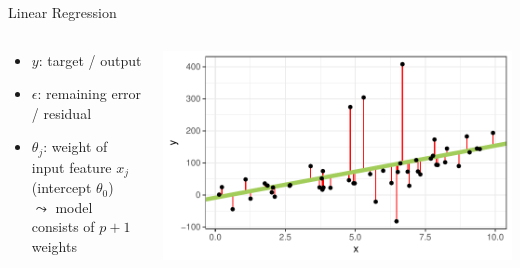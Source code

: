 \documentclass[10pt,compress,t,notes=noshow, xcolor=table]{beamer}
\begin{document}
\begin{frame}[c]{Linear Regression}
\begin{columns}[T, totalwidth = \linewidth]
\begin{column}{0.58\linewidth}
 \begin{itemize}
        \item $y$: target / output
        \item $\epsilon$: remaining error / residual %
        \item $\theta_j$: weight of input feature $x_j$ (intercept $\theta_0$)\\
        $\leadsto$ model consists of $p+1$ weights
    \end{itemize}
\end{column}
\begin{column}{0.42\linewidth}
\includegraphics[width=\linewidth]{figure/lm_example.pdf}
\end{column}
\end{columns}
   

\end{frame}
\end{document}
